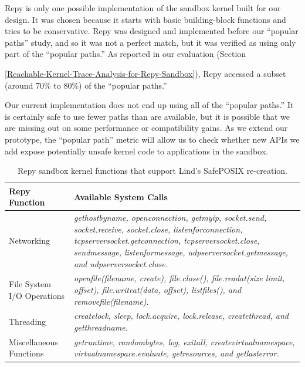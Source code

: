 Repy is only one possible implementation of the sandbox kernel built for our \lip design.
It was chosen because it starts with basic building-block functions and tries to be conservative.
Repy was designed and implemented before our ``popular paths'' study, and so it was not a perfect match,
but it was verified as using only part of the ``popular paths.''
As reported in our evaluation (Section~{{\ref{Reachable-Kernel-Trace-Analysis-for-Repy-Sandbox}}),
Repy accessed a subset (around 70\% to 80\%) of the ``popular paths.''

Our current implementation does not end up using all of the ``popular paths.''
It is certainly safe to use fewer paths than are available, but it is possible
that we are missing out on some performance or compatibility gains.
As we extend our prototype, the ``popular path'' metric will allow us to check
whether new APIs we add
expose potentially unsafe kernel code to applications in the sandbox.

\begin{table}
\centering
  \begin{tabular}{ | p{2.5cm} | p{4.5cm} |}
  \hline
  \textbf{Repy Function} & \textbf{Available System Calls}  \\ \hline

Networking & \emph{gethostbyname, openconnection, getmyip, socket.send, socket.receive, socket.close,
listenforconnection, tcpserversocket.getconnection, tcpserversocket.close, sendmessage, listenformessage,
udpserversocket.getmessage, and udpserversocket.close.} \\ \hline

File System I/O Operations & \emph{openfile(filename, create), file.close(), file.readat(size limit, offset), file.writeat(data, offset),
listfiles(), and removefile(filename).} \\ \hline

Threading & \emph{createlock, sleep, lock.acquire, lock.release, createthread, and getthreadname.} \\ \hline

Miscellaneous Functions & \emph{getruntime, randombytes, log, exitall, createvirtualnamespace,
virtualnamespace.evaluate, getresources, and getlasterror.}  \\ \hline
    \end{tabular}
    \caption{Repy sandbox kernel functions that support Lind's SafePOSIX re-creation.}
    \label{table:RepyKernel}
\end{table}


}
